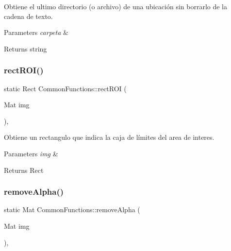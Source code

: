 Obtiene el ultimo directorio (o archivo) de una ubicación sin borrarlo de la cadena de texto. 


\begin{DoxyParams}{Parameters}
{\em carpeta} & \\
\hline
\end{DoxyParams}
\begin{DoxyReturn}{Returns}
string 
\end{DoxyReturn}
\mbox{\label{classCommonFunctions_aaa36dbe5e5b5be0caf0af58306f333bf}} 
\subsubsection{\texorpdfstring{rect\+R\+O\+I()}{rectROI()}}
{\footnotesize\ttfamily static Rect Common\+Functions\+::rect\+R\+OI (\begin{DoxyParamCaption}\item[{Mat}]{img }\end{DoxyParamCaption})\hspace{0.3cm}{\ttfamily [inline]}, {\ttfamily [static]}}



Obtiene un rectangulo que indica la caja de límites del area de interes. 


\begin{DoxyParams}{Parameters}
{\em img} & \\
\hline
\end{DoxyParams}
\begin{DoxyReturn}{Returns}
Rect 
\end{DoxyReturn}
\mbox{\label{classCommonFunctions_a511266d1137ccdefb6e7c5d156145831}} 
\subsubsection{\texorpdfstring{remove\+Alpha()}{removeAlpha()}}
{\footnotesize\ttfamily static Mat Common\+Functions\+::remove\+Alpha (\begin{DoxyParamCaption}\item[{Mat}]{img }\end{DoxyParamCaption})\hspace{0.3cm}{\ttfamily [inline]}, {\ttfamily [static]}}




